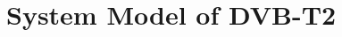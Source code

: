 \documentclass[11pt, aspectratio=169]{beamer}
\begin{document}
%		
\section{System Model of DVB-T2}

\end{document}

